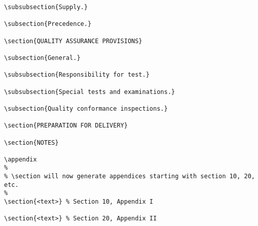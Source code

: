 \begin{itemize}
\begin{small}
\begin{verbatim}
\subsubsection{Supply.}

\subsection{Precedence.}

\section{QUALITY ASSURANCE PROVISIONS}

\subsection{General.}

\subsubsection{Responsibility for test.}

\subsubsection{Special tests and examinations.}

\subsection{Quality conformance inspections.}

\section{PREPARATION FOR DELIVERY}

\section{NOTES}

\appendix
%
% \section will now generate appendices starting with section 10, 20, etc.
%
\section{<text>} % Section 10, Appendix I

\section{<text>} % Section 20, Appendix II



\end{verbatim}
\end{small}
\end{itemize}
